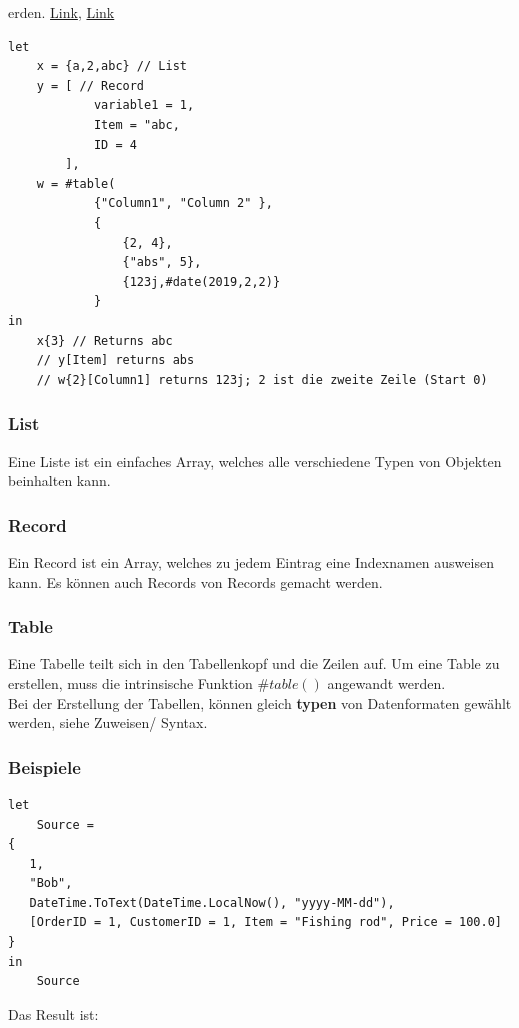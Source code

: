 erden.
\href{https://www.howtoexcel.org/power-query/m-code/}{Link}, \href{https://docs.microsoft.com/en-us/powerquery-m/expressions-values-and-let-expression}{Link}

\begin{lstlisting}[style=M]
let
	x = {a,2,abc} // List
	y = [ // Record
			variable1 = 1,
			Item = "abc,
			ID = 4
		], 
	w = #table(
			{"Column1", "Column 2" },
			{
				{2, 4},
				{"abs", 5},
				{123j,#date(2019,2,2)}
			}
in
	x{3} // Returns abc
	// y[Item] returns abs
	// w{2}[Column1] returns 123j; 2 ist die zweite Zeile (Start 0) 
\end{lstlisting} 

\subsubsection{List} Eine Liste ist ein einfaches Array, welches alle verschiedene Typen von Objekten beinhalten kann. 
\subsubsection{Record} Ein Record ist ein Array, welches zu jedem Eintrag eine Indexnamen ausweisen kann. Es können auch Records von Records gemacht werden.
\subsubsection{Table} Eine Tabelle teilt sich in den Tabellenkopf und die Zeilen auf. Um eine Table zu erstellen, muss die intrinsische Funktion $\#table()$ angewandt werden.\\

Bei der Erstellung der Tabellen, können gleich \textbf{typen} von Datenformaten gewählt werden, siehe Zuweisen/ Syntax. 

\subsubsection{Beispiele}
\begin{lstlisting}[style=M]
let  
    Source =   
{  
   1,   
   "Bob",   
   DateTime.ToText(DateTime.LocalNow(), "yyyy-MM-dd"),   
   [OrderID = 1, CustomerID = 1, Item = "Fishing rod", Price = 100.0]   
}  
in   
    Source 
\end{lstlisting}
Das Result ist: 

